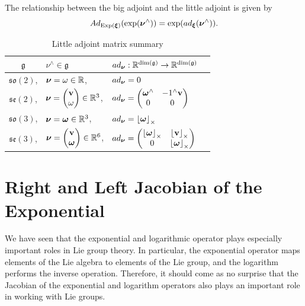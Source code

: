 The relationship between the big adjoint and the little adjoint is given by
\[
Ad_{\text{Exp}(\boldsymbol{\xi})}(\exp(\boldsymbol{\nu}^\wedge)) = \exp(ad_{\boldsymbol{\xi}}(\boldsymbol{\nu}^\wedge)).
\]

\begin{table}[hhhht]
\caption{Little adjoint matrix summary}
\label{tab:little_adjoint_matrix}
\bgroup
\def\arraystretch{1.0}
\begin{tabular}{clll}
	\toprule
	$\mathfrak{g}$ & $\nu^\wedge \in \mathfrak{g}$ & $ad_{\boldsymbol{\nu}}: \mathbb{R}^{\text{dim}(\mathfrak{g})} \to \mathbb{R}^{\text{dim}(\mathfrak{g})}$ \\
	\midrule
	$\mathfrak{so}(2)$, 
		& $\boldsymbol{\nu} = \omega\in\mathbb{R}$, 
		& $ad_{\boldsymbol{\nu}} = 0$ \\
	$\mathfrak{se}(2)$, 
		&  $\boldsymbol{\nu} = \begin{pmatrix}\mathbf{v} \\ \omega \end{pmatrix} \in \mathbb{R}^3$, 
		& $ad_{\boldsymbol{\nu}} = \begin{pmatrix} \boldsymbol{\omega}^\wedge & -1^\wedge\mathbf{v} \\ 0 & 0 \end{pmatrix}$  \\
	$\mathfrak{so}(3)$, 
		&  $\boldsymbol{\nu} = \boldsymbol{\omega} \in \mathbb{R}^3$, 
		& $ad_{\boldsymbol{\nu}} = \left\lfloor\boldsymbol{\omega}\right\rfloor_{\times}$ \\
	$\mathfrak{se}(3)$, 
		&  $\boldsymbol{\nu} = \begin{pmatrix}\mathbf{v} \\ \boldsymbol{\omega} \end{pmatrix} \in \mathbb{R}^6$, 
		& $ad_{\boldsymbol{\nu}} = \begin{pmatrix} \left\lfloor\boldsymbol{\omega}\right\rfloor_{\times} & \left\lfloor\mathbf{v}\right\rfloor_{\times} \\ 0 & \left\lfloor\boldsymbol{\omega}\right\rfloor_{\times} \end{pmatrix}$ \\
	\bottomrule
\end{tabular}
\egroup
\end{table}





\section{Right and Left Jacobian of the Exponential}

We have seen that the exponential and logarithmic operator plays especially important roles in Lie group theory.  In particular, the exponential operator maps elements of the Lie algebra to elements of the Lie group, and the logarithm performs the inverse operation.  Therefore, it should come as no surprise that the Jacobian of the exponential and logarithm operators also plays an important role in working with Lie groups.

